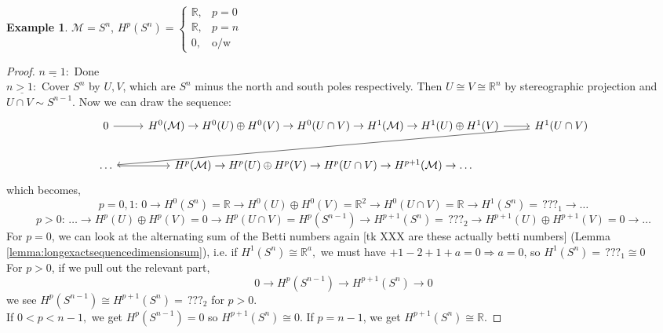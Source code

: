 \documentclass[10pt]{article}
\theoremstyle{plain}
\theoremstyle{definition}
\newtheorem{exmp}[thm]{Example} %
\newcommand{\Real}{\mathbb{R}}
\newcommand{\man}{\mathcal{M}}
\newcommand{\cohomman}[1]{H^{#1}(\man)}
\newcommand{\UintV}{U\cap V}
\newcommand{\cohomUV}[1]{H^{#1}(U)\oplus H^{#1}(V)}
\newcommand{\cohom}[2]{H^{#1}(#2)}
\begin{document}
\begin{exmp} $\man = S^n$, $H^p(S^n) = \begin{cases} \Real ,& p = 0\\ \Real, & p = n\\ 0, & \text{o/w}\end{cases}$\\
\begin{proof}
$\underline{n=1:}$ Done\\
$\underline{ n > 1:}$ Cover $S^n$ by $U, V$, which are $S^n$ minus the north and south poles respectively. Then $U\cong V \cong \Real^n$ by stereographic projection and $\UintV \sim S^{n-1}$. Now we can draw the sequence:
$$
\begin{tikzcd}
0 \arrow[r]&  \cohomman{0} \to H^0(U)\oplus H^0(V) \to H^0(\UintV) \to \cohomman{1} \to H^1(U)\oplus H^1(V) \arrow[r] &  H^1(\UintV) \arrow[lld]                                                                 \\
\dots \arrow[r]                                                                                                               &   H^p(\man) \to  H^p(U)\oplus H^p(V) \to H^p(\UintV) \to H^{p+1}(\man) \to \dots
\end{tikzcd}
$$
which becomes,
$$p = 0,1: \, 0 \to \cohom{0}{S^n}  = \Real\to \cohomUV{0} = \Real^2 \to \cohom{0}{\UintV} = \Real \to \cohom{1}{S^n} = \,???_1 \to \dots$$
$$p > 0 : \, \dots \to \cohomUV{p} = 0 \to \cohom{p}{\UintV} = \cohom{p}{S^{n-1}} \to \cohom{p+1}{S^n} =\, ???_2 \to \cohomUV{p+1} = 0\to \dots$$
For $p = 0$, we can look at the alternating sum of the Betti numbers again [tk XXX are these actually betti numbers] (Lemma \ref{lemma:longexactsequencedimensionsum}), i.e. if $\cohom{1}{S^n} \cong \Real ^a,$ we must have $+1 -2 +1 +a = 0 \Rightarrow a = 0$, so $\cohom{1}{S^n} = \,???_1 \cong 0$\\
For $p>0$, if we pull out the relevant part,
$$ 0 \to \cohom{p}{S^{n-1}} \to \cohom{p+1}{S^n} \to 0$$
we see $\cohom{p}{S^{n-1}} \cong \cohom{p+1}{S^n}  = \, ???_2$ for $p > 0$. \\
If $ 0 < p < n-1,$ we get $\cohom{p}{S^{n-1}} = 0$ so $\cohom{p+1}{S^n} \cong 0$. If $p = n-1$, we get $\cohom{p+1}{S^n} \cong \Real$.
\end{proof}
\end{exmp}
\end{document}
